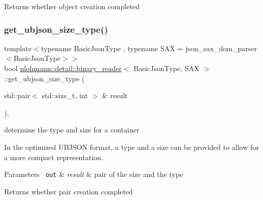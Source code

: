 \begin{DoxyReturn}{Returns}
whether object creation completed 
\end{DoxyReturn}
\mbox{\label{classnlohmann_1_1detail_1_1binary__reader_a4eae4604064b5dfe6d04e42ffc9e0753}} 
\subsubsection{\texorpdfstring{get\_ubjson\_size\_type()}{get\_ubjson\_size\_type()}}
{\footnotesize\ttfamily template$<$typename Basic\+Json\+Type , typename S\+AX  = json\+\_\+sax\+\_\+dom\+\_\+parser$<$\+Basic\+Json\+Type$>$$>$ \\
bool \mbox{\hyperlink{classnlohmann_1_1detail_1_1binary__reader}{nlohmann\+::detail\+::binary\+\_\+reader}}$<$ Basic\+Json\+Type, S\+AX $>$\+::get\+\_\+ubjson\+\_\+size\+\_\+type (\begin{DoxyParamCaption}\item[{std\+::pair$<$ std\+::size\+\_\+t, int $>$ \&}]{result }\end{DoxyParamCaption})\hspace{0.3cm}{\ttfamily [inline]}, {\ttfamily [private]}}



determine the type and size for a container 

In the optimized U\+B\+J\+S\+ON format, a type and a size can be provided to allow for a more compact representation.


\begin{DoxyParams}[1]{Parameters}
\mbox{\texttt{ out}}  & {\em result} & pair of the size and the type\\
\hline
\end{DoxyParams}
\begin{DoxyReturn}{Returns}
whether pair creation completed 
\end{DoxyReturn}
\mbox{\label{classnlohmann_1_1detail_1_1binary__reader_a435be58e83c8491556d8f1a1b3439155}} 
